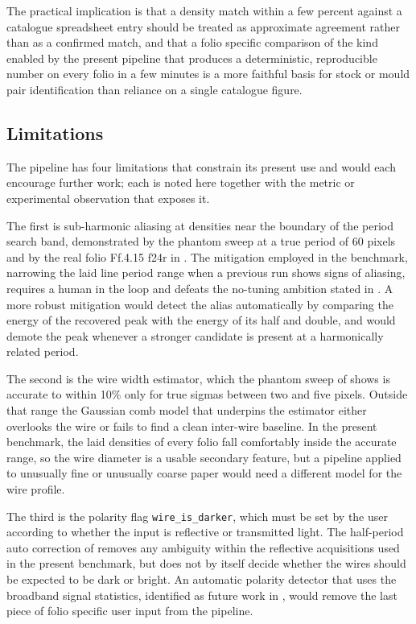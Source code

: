 The practical implication is that a density match within a few
percent against a catalogue spreadsheet entry should be treated
as approximate agreement rather than as a confirmed match, and
that a folio specific comparison of the kind enabled by the present
pipeline that produces a deterministic, reproducible number
on every folio in a few minutes is a more faithful basis for
stock or mould pair identification than reliance on a single
catalogue figure.

\subsection{Limitations}
\label{sec:discussion:limitations}

The pipeline has four limitations that constrain its present use
and would each encourage further work; each is noted here together
with the metric or experimental observation that exposes it.

The first is sub-harmonic aliasing at densities near the boundary
of the period search band, demonstrated by the phantom sweep at a
true period of 60 pixels and by the real folio Ff.4.15 f24r in
. The mitigation employed in the
benchmark, narrowing the laid line period range when a previous
run shows signs of aliasing, requires a human in the loop and
defeats the no-tuning ambition stated in
. A more robust mitigation would
detect the alias automatically by comparing the energy of the
recovered peak with the energy of its half and double, and would
demote the peak whenever a stronger candidate is present at a
harmonically related period.

The second is the wire width estimator, which the phantom sweep
of  shows is accurate to within 10\%
 only for true sigmas between two and five pixels. Outside
that range the Gaussian comb model that underpins the estimator
either overlooks the wire or fails to find a clean inter-wire
baseline. In the present benchmark, the laid densities of every
folio fall comfortably inside the accurate range, so the wire
diameter is a usable secondary feature, but a pipeline applied to
unusually fine or unusually coarse paper would need a different
model for the wire profile.

The third is the polarity flag \texttt{wire\_is\_darker}, which
must be set by the user according to whether the input is
reflective or transmitted light. The half-period auto correction
of  removes any ambiguity within the
reflective acquisitions used in the present benchmark, but does
not by itself decide whether the wires should be expected to be
dark or bright. An automatic polarity detector that uses the
broadband signal statistics, identified as future work in
, would remove the last piece of folio specific
user input from the pipeline.

